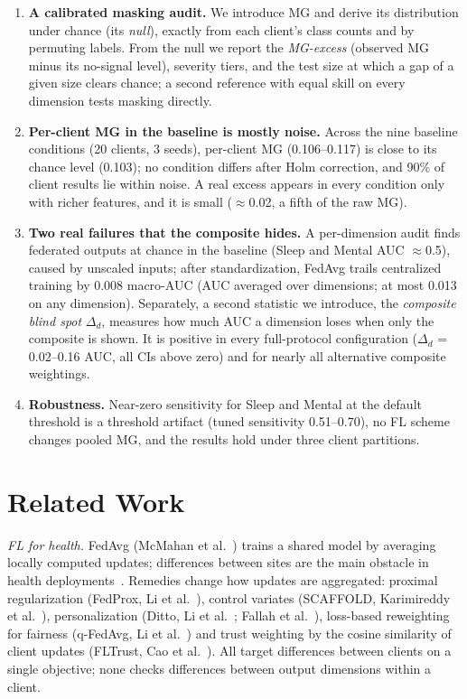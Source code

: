 \begin{enumerate}
\item \textbf{A calibrated masking audit.} We introduce MG and derive its distribution under chance (its \emph{null}), exactly from each client's class counts and by permuting labels. From the null we report the \emph{MG-excess} (observed MG minus its no-signal level), severity tiers, and the test size at which a gap of a given size clears chance; a second reference with equal skill on every dimension tests masking directly.
\item \textbf{Per-client MG in the baseline is mostly noise.} Across the nine baseline conditions (20 clients, 3 seeds), per-client MG (0.106--0.117) is close to its chance level (0.103); no condition differs after Holm correction, and 90\% of client results lie within noise. A real excess appears in every condition only with richer features, and it is small ($\approx$0.02, a fifth of the raw MG).
\item \textbf{Two real failures that the composite hides.} A per-dimension audit finds federated outputs at chance in the baseline (Sleep and Mental AUC $\approx$0.5), caused by unscaled inputs; after standardization, FedAvg trails centralized training by 0.008 macro-AUC (AUC averaged over dimensions; at most 0.013 on any dimension). Separately, a second statistic we introduce, the \emph{composite blind spot} $\Delta_d$, measures how much AUC a dimension loses when only the composite is shown. It is positive in every full-protocol configuration ($\Delta_d$ = 0.02--0.16 AUC, all CIs above zero) and for nearly all alternative composite weightings.
\item \textbf{Robustness.} Near-zero sensitivity for Sleep and Mental at the default threshold is a threshold artifact (tuned sensitivity 0.51--0.70), no FL scheme changes pooled MG, and the results hold under three client partitions.
\end{enumerate}

\section{Related Work}

\emph{FL for health.} FedAvg (McMahan et al.~\cite{mcmahan2017}) trains a shared model by averaging locally computed updates; differences between sites are the main obstacle in health deployments~\cite{rieke2020,grataloup2024}. Remedies change how updates are aggregated: proximal regularization (FedProx, Li et al.~\cite{li2020fedprox}), control variates (SCAFFOLD, Karimireddy et al.~\cite{karimireddy2020}), personalization (Ditto, Li et al.~\cite{li2021ditto}; Fallah et al.~\cite{fallah2020}), loss-based reweighting for fairness (q-FedAvg, Li et al.~\cite{li2020qfedavg}) and trust weighting by the cosine similarity of client updates (FLTrust, Cao et al.~\cite{cao2021fltrust}). All target differences between clients on a single objective; none checks differences between output dimensions within a client.

